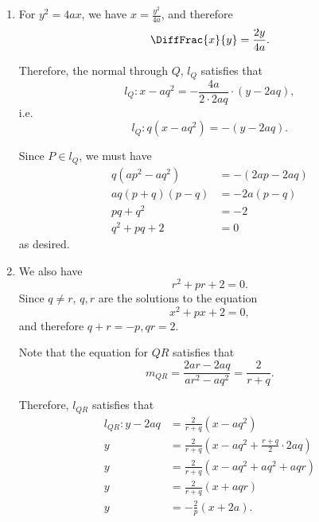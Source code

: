 \Question{\currfilebase}

\begin{enumerate}
    \item For \(y^2 = 4ax\), we have \(x = \frac{y^2}{4a}\), and therefore
          \[
              \DiffFrac{x}{y} = \frac{2y}{4a}.
          \]

          Therefore, the normal through \(Q\), \(l_Q\) satisfies that
          \[
              l_Q: x - aq^2 = - \frac{4a}{2 \cdot 2aq} \cdot \left(y - 2aq\right),
          \]
          i.e.
          \[
              l_Q: q(x - aq^2) =  -\left(y - 2aq\right).
          \]

          Since \(P \in l_Q\), we must have
          \begin{align*}
              q(ap^2 - aq^2) & =  -\left(2ap - 2aq\right) \\
              aq(p+q)(p-q)   & = -2a (p-q)                \\
              pq + q^2       & = -2                       \\
              q^2 + pq + 2   & = 0
          \end{align*}
          as desired.

    \item We also have
          \[
              r^2 + pr + 2 = 0.
          \]
          Since \(q \neq r\), \(q, r\) are the solutions to the equation
          \[
              x^2 + px + 2 = 0,
          \]
          and therefore \(q + r = -p, qr = 2\).

          Note that the equation for \(QR\) satisfies that
          \[
              m_{QR} = \frac{2ar - 2aq}{ar^2 - aq^2} = \frac{2}{r + q}.
          \]

          Therefore, \(l_{QR}\) satisfies that
          \begin{align*}
              l_{QR}: y - 2aq & = \frac{2}{r + q} (x - aq^2)                                      \\
              y               & = \frac{2}{r + q} \left(x - aq^2 + \frac{r + q}{2}\cdot2aq\right) \\
              y               & = \frac{2}{r + q} \left(x - aq^2 + aq^2 + aqr\right)              \\
              y               & = \frac{2}{r + q} \left(x + aqr\right)                            \\
              y               & = -\frac{2}{p} (x + 2a).
          \end{align*}


\end{enumerate}
